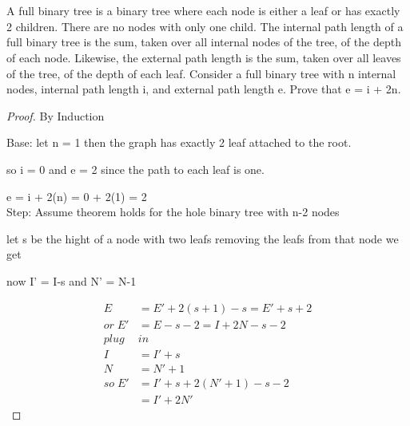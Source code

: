 \documentclass[12pt]{article}
\begin{document}
\section{} 
A full binary tree is a binary tree where each node is either a leaf or has exactly 2 children.
There are no nodes with only one child.
The internal path length of a full binary tree is the sum, taken over all internal nodes
of the tree, of the depth of each node. Likewise, the external path length is the sum,
taken over all leaves of the tree, of the depth of each leaf. Consider a full binary tree with
n internal nodes, internal path length i, and external path length e. Prove that
e = i + 2n.
\begin{proof} By Induction 

	Base: let n = 1 then the graph has exactly 2 leaf attached to the root. 
	
	so i = 0 and e = 2 since the path to each leaf is one.
	
	e = i + 2(n) = 0 + 2(1) = 2\\

	Step:  Assume theorem holds for the hole binary tree with n-2 nodes
	
	let s be the hight of a node with two leafs removing the leafs from that node we get
	
	now I' = I-s and N' = N-1

	\begin{align*}
	E &= E' + 2(s+1) -s = E' +s+2\\
	or \; E' &= E-s-2 = I+2N -s -2\\
	 plug \; &in\\
	 I &= I' + s\\
	 N &= N' +1\\
	 so \; E' &= I' + s + 2(N' +1) -s -2\\
	 &= I' +2N'
	\end{align*}
	
\end{proof}
 



\end{document}
